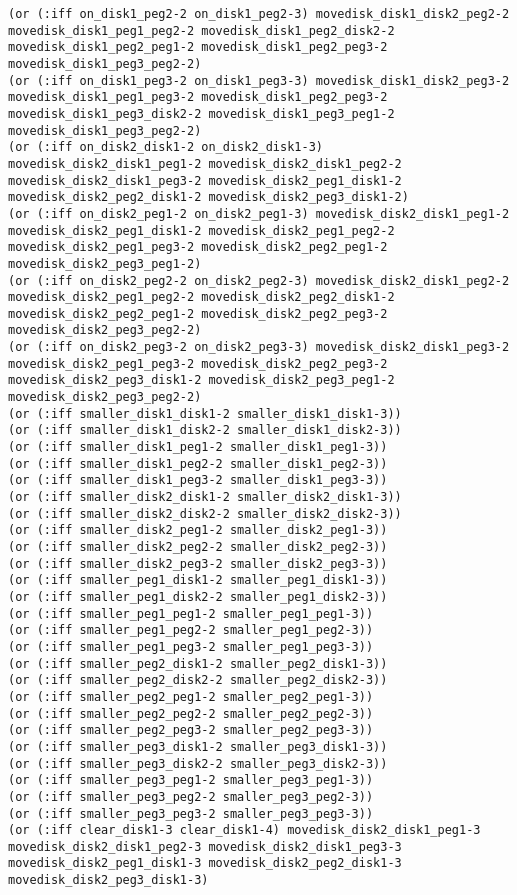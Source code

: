 \documentclass[12pt,letterpaper]{ntdhw}
\begin{document}
\begin{enumerate}
\begin{enumerate}
\begin{lstlisting}[language=pddl, style=pddlstyle,
  basicstyle=\scriptsize]
(or (:iff on_disk1_peg2-2 on_disk1_peg2-3) movedisk_disk1_disk2_peg2-2 movedisk_disk1_peg1_peg2-2 movedisk_disk1_peg2_disk2-2 movedisk_disk1_peg2_peg1-2 movedisk_disk1_peg2_peg3-2 movedisk_disk1_peg3_peg2-2)
(or (:iff on_disk1_peg3-2 on_disk1_peg3-3) movedisk_disk1_disk2_peg3-2 movedisk_disk1_peg1_peg3-2 movedisk_disk1_peg2_peg3-2 movedisk_disk1_peg3_disk2-2 movedisk_disk1_peg3_peg1-2 movedisk_disk1_peg3_peg2-2)
(or (:iff on_disk2_disk1-2 on_disk2_disk1-3) movedisk_disk2_disk1_peg1-2 movedisk_disk2_disk1_peg2-2 movedisk_disk2_disk1_peg3-2 movedisk_disk2_peg1_disk1-2 movedisk_disk2_peg2_disk1-2 movedisk_disk2_peg3_disk1-2)
(or (:iff on_disk2_peg1-2 on_disk2_peg1-3) movedisk_disk2_disk1_peg1-2 movedisk_disk2_peg1_disk1-2 movedisk_disk2_peg1_peg2-2 movedisk_disk2_peg1_peg3-2 movedisk_disk2_peg2_peg1-2 movedisk_disk2_peg3_peg1-2)
(or (:iff on_disk2_peg2-2 on_disk2_peg2-3) movedisk_disk2_disk1_peg2-2 movedisk_disk2_peg1_peg2-2 movedisk_disk2_peg2_disk1-2 movedisk_disk2_peg2_peg1-2 movedisk_disk2_peg2_peg3-2 movedisk_disk2_peg3_peg2-2)
(or (:iff on_disk2_peg3-2 on_disk2_peg3-3) movedisk_disk2_disk1_peg3-2 movedisk_disk2_peg1_peg3-2 movedisk_disk2_peg2_peg3-2 movedisk_disk2_peg3_disk1-2 movedisk_disk2_peg3_peg1-2 movedisk_disk2_peg3_peg2-2)
(or (:iff smaller_disk1_disk1-2 smaller_disk1_disk1-3))
(or (:iff smaller_disk1_disk2-2 smaller_disk1_disk2-3))
(or (:iff smaller_disk1_peg1-2 smaller_disk1_peg1-3))
(or (:iff smaller_disk1_peg2-2 smaller_disk1_peg2-3))
(or (:iff smaller_disk1_peg3-2 smaller_disk1_peg3-3))
(or (:iff smaller_disk2_disk1-2 smaller_disk2_disk1-3))
(or (:iff smaller_disk2_disk2-2 smaller_disk2_disk2-3))
(or (:iff smaller_disk2_peg1-2 smaller_disk2_peg1-3))
(or (:iff smaller_disk2_peg2-2 smaller_disk2_peg2-3))
(or (:iff smaller_disk2_peg3-2 smaller_disk2_peg3-3))
(or (:iff smaller_peg1_disk1-2 smaller_peg1_disk1-3))
(or (:iff smaller_peg1_disk2-2 smaller_peg1_disk2-3))
(or (:iff smaller_peg1_peg1-2 smaller_peg1_peg1-3))
(or (:iff smaller_peg1_peg2-2 smaller_peg1_peg2-3))
(or (:iff smaller_peg1_peg3-2 smaller_peg1_peg3-3))
(or (:iff smaller_peg2_disk1-2 smaller_peg2_disk1-3))
(or (:iff smaller_peg2_disk2-2 smaller_peg2_disk2-3))
(or (:iff smaller_peg2_peg1-2 smaller_peg2_peg1-3))
(or (:iff smaller_peg2_peg2-2 smaller_peg2_peg2-3))
(or (:iff smaller_peg2_peg3-2 smaller_peg2_peg3-3))
(or (:iff smaller_peg3_disk1-2 smaller_peg3_disk1-3))
(or (:iff smaller_peg3_disk2-2 smaller_peg3_disk2-3))
(or (:iff smaller_peg3_peg1-2 smaller_peg3_peg1-3))
(or (:iff smaller_peg3_peg2-2 smaller_peg3_peg2-3))
(or (:iff smaller_peg3_peg3-2 smaller_peg3_peg3-3))
(or (:iff clear_disk1-3 clear_disk1-4) movedisk_disk2_disk1_peg1-3 movedisk_disk2_disk1_peg2-3 movedisk_disk2_disk1_peg3-3 movedisk_disk2_peg1_disk1-3 movedisk_disk2_peg2_disk1-3 movedisk_disk2_peg3_disk1-3)

\end{lstlisting}
\end{enumerate}
\end{enumerate}
\end{document}
